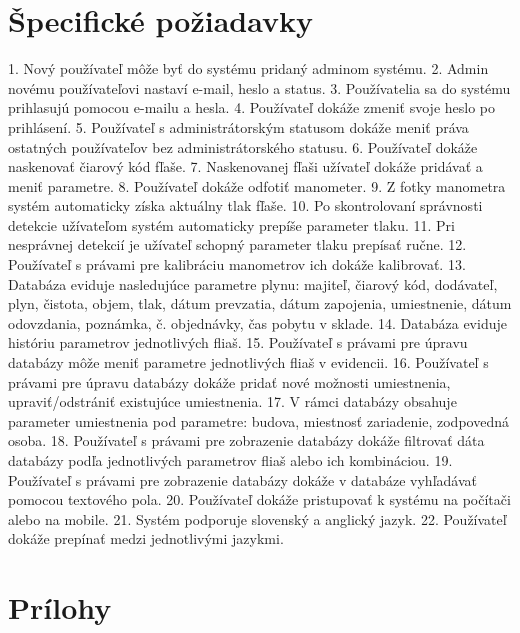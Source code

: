 \documentclass[hreffootnote]{zah}
\begin{document}
\section{Špecifické požiadavky}
1.	Nový používateľ môže byť do systému pridaný adminom systému.
2.	Admin novému používateľovi nastaví e-mail, heslo a status.
3.	Používatelia sa do systému prihlasujú pomocou e-mailu a hesla.
4.	Používateľ dokáže zmeniť svoje heslo po prihlásení.
5.	Používateľ s administrátorským statusom dokáže meniť práva ostatných používateľov bez administrátorského statusu.
6.	Používateľ dokáže naskenovať čiarový kód fľaše.
7.	Naskenovanej fľaši užívateľ dokáže pridávať a meniť parametre.
8.	Používateľ dokáže odfotiť manometer.
9.	Z fotky manometra systém automaticky získa aktuálny tlak fľaše.
10.	Po skontrolovaní správnosti detekcie užívateľom systém automaticky prepíše parameter tlaku.
11.	Pri nesprávnej detekcií je užívateľ schopný parameter tlaku prepísať ručne.
12.	Používateľ s právami pre kalibráciu manometrov ich dokáže kalibrovať.
13.	Databáza eviduje nasledujúce parametre plynu: majiteľ, čiarový kód, dodávateľ, plyn, čistota, objem, tlak, dátum prevzatia, dátum zapojenia, umiestnenie, dátum odovzdania, poznámka, č. objednávky, čas pobytu v sklade.
14.	Databáza eviduje históriu parametrov jednotlivých fliaš. 
15.	Používateľ s právami pre úpravu databázy môže meniť parametre jednotlivých fliaš v evidencii. 
16.	Používateľ s právami pre úpravu databázy dokáže pridať nové možnosti umiestnenia, upraviť/odstrániť existujúce umiestnenia.
17.	V rámci databázy obsahuje parameter umiestnenia pod parametre: budova, miestnosť zariadenie, zodpovedná osoba.
18.	Používateľ s právami pre zobrazenie databázy dokáže filtrovať dáta databázy podľa jednotlivých parametrov fliaš alebo ich kombináciou.
19.	Používateľ s právami pre zobrazenie databázy dokáže v databáze vyhľadávať pomocou textového pola.
20.	Používateľ dokáže pristupovať k systému na počítači alebo na mobile.
21.	Systém podporuje slovenský a anglický jazyk. 
22.	Používateľ dokáže prepínať medzi jednotlivými jazykmi.

\label{reqs}

\cleardoublepage
\section{Prílohy}
\end{document}
